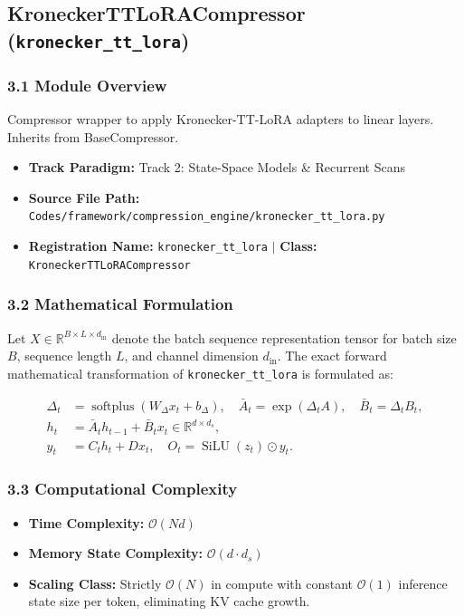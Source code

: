 \subsection{KroneckerTTLoRACompressor (\texttt{kronecker\_tt\_lora})}
\label{sec:app_module_kronecker\_tt\_lora}

\subsubsection*{3.1 Module Overview}
Compressor wrapper to apply Kronecker-TT-LoRA adapters to linear layers. Inherits from BaseCompressor.
\begin{itemize}
    \item \textbf{Track Paradigm:} Track 2: State-Space Models & Recurrent Scans
    \item \textbf{Source File Path:} \texttt{Codes/framework/compression\_engine/kronecker\_tt\_lora.py}
    \item \textbf{Registration Name:} \texttt{kronecker\_tt\_lora} $\mid$ \textbf{Class:} \texttt{KroneckerTTLoRACompressor}
\end{itemize}

\subsubsection*{3.2 Mathematical Formulation}
Let $X \in \mathbb{R}^{B \times L \times d_{\text{in}}}$ denote the batch sequence representation tensor for batch size $B$, sequence length $L$, and channel dimension $d_{\text{in}}$. The exact forward mathematical transformation of \texttt{kronecker\_tt\_lora} is formulated as:

\begin{align}
\Delta_t &= \operatorname{softplus}(W_\Delta x_t + b_\Delta), \quad \bar{A}_t = \exp(\Delta_t A), \quad \bar{B}_t = \Delta_t B_t, \\
h_t &= \bar{A}_t h_{t-1} + \bar{B}_t x_t \in \mathbb{R}^{d \times d_s}, \\
y_t &= C_t h_t + D x_t, \quad O_t = \operatorname{SiLU}(z_t) \odot y_t.
\end{align}


\subsubsection*{3.3 Computational Complexity}
\begin{itemize}
    \item \textbf{Time Complexity:} $\mathcal{O}(N d)$
    \item \textbf{Memory State Complexity:} $\mathcal{O}(d \cdot d_s)$
    \item \textbf{Scaling Class:} Strictly $\mathcal{O}(N)$ in compute with constant $\mathcal{O}(1)$ inference state size per token, eliminating KV cache growth.
\end{itemize}

